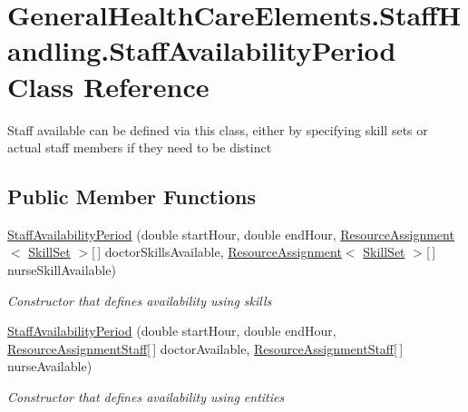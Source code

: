\hypertarget{class_general_health_care_elements_1_1_staff_handling_1_1_staff_availability_period}{}\section{General\+Health\+Care\+Elements.\+Staff\+Handling.\+Staff\+Availability\+Period Class Reference}
\label{class_general_health_care_elements_1_1_staff_handling_1_1_staff_availability_period}


Staff available can be defined via this class, either by specifying skill sets or actual staff members if they need to be distinct  


\subsection*{Public Member Functions}
\begin{DoxyCompactItemize}
\item 
\hyperlink{class_general_health_care_elements_1_1_staff_handling_1_1_staff_availability_period_a4fed502ca127b790f771c03c6616429a}{Staff\+Availability\+Period} (double start\+Hour, double end\+Hour, \hyperlink{class_general_health_care_elements_1_1_resource_handling_1_1_resource_assignment}{Resource\+Assignment}$<$ \hyperlink{class_simulation_core_1_1_h_c_c_m_elements_1_1_skill_set}{Skill\+Set} $>$\mbox{[}$\,$\mbox{]} doctor\+Skills\+Available, \hyperlink{class_general_health_care_elements_1_1_resource_handling_1_1_resource_assignment}{Resource\+Assignment}$<$ \hyperlink{class_simulation_core_1_1_h_c_c_m_elements_1_1_skill_set}{Skill\+Set} $>$\mbox{[}$\,$\mbox{]} nurse\+Skill\+Available)
\begin{DoxyCompactList}\small\item\em Constructor that defines availability using skills \end{DoxyCompactList}\item 
\hyperlink{class_general_health_care_elements_1_1_staff_handling_1_1_staff_availability_period_ad2d029fc9a77c2b4e2bae3a414713914}{Staff\+Availability\+Period} (double start\+Hour, double end\+Hour, \hyperlink{class_general_health_care_elements_1_1_resource_handling_1_1_resource_assignment_staff}{Resource\+Assignment\+Staff}\mbox{[}$\,$\mbox{]} doctor\+Available, \hyperlink{class_general_health_care_elements_1_1_resource_handling_1_1_resource_assignment_staff}{Resource\+Assignment\+Staff}\mbox{[}$\,$\mbox{]} nurse\+Available)
\begin{DoxyCompactList}\small\item\em Constructor that defines availability using entities \end{DoxyCompactList}\end{DoxyCompactItemize}
